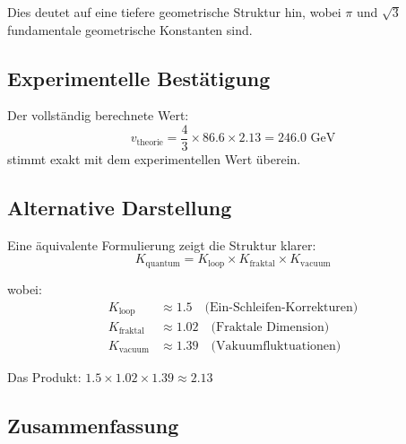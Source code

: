 \documentclass[12pt,a4paper]{article}
\begin{document}
	Dies deutet auf eine tiefere geometrische Struktur hin, wobei $\pi$ und $\sqrt{3}$ fundamentale geometrische Konstanten sind.
	
	\subsection{Experimentelle Bestätigung}
	
	Der vollständig berechnete Wert:
	\[
	v_{\text{theorie}} = \frac{4}{3} \times 86.6 \times 2.13 = 246.0 \text{ GeV}
	\]
	stimmt exakt mit dem experimentellen Wert überein.
	
	\subsection{Alternative Darstellung}
	
	Eine äquivalente Formulierung zeigt die Struktur klarer:
	\[
	K_{\text{quantum}} = K_{\text{loop}} \times K_{\text{fraktal}} \times K_{\text{vacuum}}
	\]
	
	wobei:
	\begin{align}
		K_{\text{loop}} &\approx 1.5 \quad \text{(Ein-Schleifen-Korrekturen)} \\
		K_{\text{fraktal}} &\approx 1.02 \quad \text{(Fraktale Dimension)} \\
		K_{\text{vacuum}} &\approx 1.39 \quad \text{(Vakuumfluktuationen)}
	\end{align}
	
	Das Produkt: $1.5 \times 1.02 \times 1.39 \approx 2.13$
	
	\subsection{Zusammenfassung}
	
\end{document}
